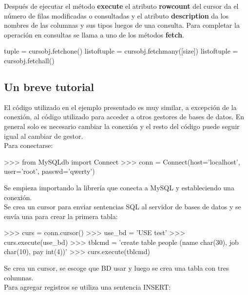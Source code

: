 Después de ejecutar el método \textbf{execute} el atributo \textbf{rowcount} del cursor da el número de filas modificadas o consultadas y el atributo \textbf{description} da los nombres de las columnas y sus tipos luegos de una consulta. Para completar la operación en consultas se llama a uno de los métodos \textbf{fetch}.\\

\begin{pyglist} [language=python]
tuple = cursobj.fetchone()
listoftuple = cursobj.fetchmany([size])
listoftuple = cursobj.fetchall()
\end{pyglist}

\subsection{Un breve tutorial}

El código utilizado en el ejemplo presentado es muy similar, a excepción de la conexión, al código utilizado para acceder a otros gestores de bases de datos. En general solo es necesario cambiar la conexión y el resto del código puede seguir igual al cambiar de gestor.\\

Para conectarse:\\

\begin{pyglist} [language=python]
>>> from MySQLdb import Connect
>>> conn = Connect(host='localhost', user='root', passwd='qwerty')
\end{pyglist}

Se empieza importando la librería que conecta a MySQL y estableciendo una conexión.\\

Se crea un cursor para enviar sentencias SQL al servidor de bases de datos y se envía una para crear la primera tabla:\\

\begin{pyglist} [language=python]
>>> curs = conn.cursor()
>>> use_bd = 'USE test'
>>> curs.execute(use_bd)
>>> tblcmd = 'create table people (name char(30), job char(10), pay int(4))'
>>> curs.execute(tblcmd)
\end{pyglist}

Se crea un cursor, se escoge que BD usar y luego se crea una tabla con tres columnas.\\

Para agregar registros se utiliza una sentencia INSERT:\\

